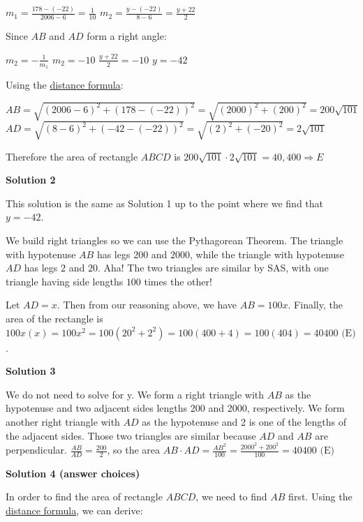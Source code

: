 \begin{enumerate}
 $m_1 = \frac{178-(-22)}{2006-6} = \frac{1}{10}$
$m_2 = \frac{y-(-22)}{8-6} = \frac{y+22}{2}$

 Since $AB$ and $AD$ form a right angle: 

 $m_2 = -\frac{1}{m_1}$
$m_2 = -10$
$\frac{y+22}{2} = -10$
$y = -42$

 Using the \href{https://artofproblemsolving.com/wiki/index.php?title=Distance\_formula}{distance formula}:

 $AB = \sqrt{ (2006-6)^2 + (178-(-22))^2 } = \sqrt{ (2000)^2 + (200)^2 } = 200\sqrt{101}$
$AD = \sqrt{ (8-6)^2 + (-42-(-22))^2 } = \sqrt{ (2)^2 + (-20)^2 } = 2\sqrt{101}$

 Therefore the area of rectangle $ABCD$ is $200\sqrt{101}\cdot2\sqrt{101} = 40,400 \Rightarrow E$




\textbf{Solution 2}

This solution is the same as Solution 1 up to the point where we find that $y=-42$.

 We build right triangles so we can use the Pythagorean Theorem.  The triangle with hypotenuse $AB$ has legs $200$ and $2000$, while the triangle with hypotenuse $AD$ has legs $2$ and $20$.  Aha!  The two triangles are similar by SAS, with one triangle having side lengths $100$ times the other!

 Let $AD=x$.  Then from our reasoning above, we have $AB=100x$.  Finally, the area of the rectangle is $100x(x)=100x^2=100(20^2+2^2)=100(400+4)=100(404)=\boxed{40400 \text{  (E)}}$.

 



\textbf{Solution 3}

We do not need to solve for y. We form a right triangle with $AB$ as the hypotenuse and two adjacent sides lengths 200 and 2000, respectively. We form another right triangle with $AD$ as the hypotenuse and 2 is one of the lengths of the adjacent sides. Those two triangles are similar because $AD$ and $AB$ are perpendicular. $\frac{AB}{AD} = \frac{200}{2}$, so the area $AB \cdot AD = \frac {AB^2}{100} = \frac {2000^2 + 200^2}{100} = \boxed{40400 \text{  (E)}}$




\textbf{Solution 4 (answer choices)}

In order to find the area of rectangle $ABCD$, we need to find $AB$ first. Using the \href{https://artofproblemsolving.com/wiki/index.php?title=Distance\_formula}{distance formula}, we can derive:


\end{enumerate}

